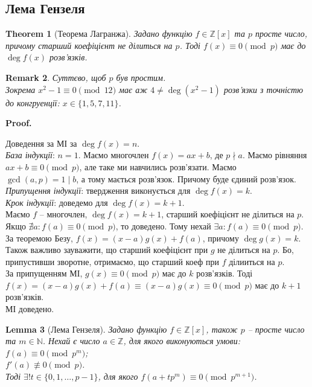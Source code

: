 \documentclass[a4paper, 14pt]{extarticle}
\makeatletter
\theoremstyle{theoremdd}
\newtheorem{theorem}{Theorem}[subsection]
\theoremstyle{theoremdd}
\theoremstyle{theoremdd}
\theoremstyle{theoremdd}
\theoremstyle{theoremdd}
\theoremstyle{theoremdd}
\newtheorem{remark}[theorem]{Remark}
\theoremstyle{theoremdd}
\newtheorem{lemma}[theorem]{Lemma}
\theoremstyle{theoremdd}
\def\qed{$\blacksquare$}
\renewenvironment{proof}[1][Proof.\\]{\par
\pushQED{\hfill \qed}%
\normalfont \topsep6\p@\@plus6\p@\relax
\trivlist
\item\relax
{\bfseries
#1\@addpunct{.}}\hspace\labelsep\ignorespaces
}{%
\popQED\endtrivlist\@endpefalse
}
\makeatother
\begin{document}
\subsection{Лема Гензеля}
\begin{theorem}[Теорема Лагранжа]
Задано функцію $f \in \mathbb{Z}[x]$ та $p$ просте число, причому старший коефіцієнт не ділиться на $p$. Тоді $f(x) \equiv 0 \pmod p$ має до $\deg f(x)$ розв'язків.
\end{theorem}

\begin{remark}
Суттєво, щоб $p$ був простим.\\
Зокрема $x^2 -1 \equiv 0 \pmod {12}$ має аж $4 \neq \deg (x^2-1)$ розв'язки з точністю до конгруенції: $x \in \{1,5,7,11\}$.
\end{remark}

\begin{proof}
Доведення за МІ за $\deg f(x) = n$.\\
\textit{База індукції}: $n = 1$. Маємо многочлен $f(x) = ax+b$, де $p \nmid a$. Маємо рівняння $ax+b \equiv 0 \pmod p$, але таке ми навчились розв'язати. Маємо $\gcd(a,p) = 1 \mid b$, а тому мається розв'язок. Причому буде єдиний розв'язок.\\
\textit{Припущення індукції}: твердження виконується для $\deg f(x) = k$.\\ \textit{Крок індукції}: доведемо для $\deg f(x) = k+1$.\\
Маємо $f$ -- многочлен, $\deg f(x) = k+1$, старший коефіцієнт не ділиться на $p$. Якщо $\nexists a: f(a) \equiv 0 \pmod p$, то доведено. Тому нехай $\exists a: f(a) \equiv 0 \pmod p$. За теоремою Безу, $f(x) = (x-a)g(x) + f(a)$, причому $\deg g(x) = k$. Також важливо зауважити, що старший коефіцієнт при $g$ не ділиться на $p$. Бо, припустивши зворотне, отримаємо, що старший коеф при $f$ ділииться на $p$.\\
За припущенням МІ, $g(x) \equiv 0 \pmod p$ має до $k$ розв'язків. Тоді $f(x) = (x-a)g(x) + f(a) \equiv (x-a)g(x) \equiv 0 \pmod p$ має до $k+1$ розв'язків.\\
МІ доведено.
\end{proof}

\begin{lemma}[Лема Гензеля]
Задано функцію $f \in \mathbb{Z}[x]$, також $p$ -- просте число та $m \in \mathbb{N}$. Нехай є число $a \in \mathbb{Z}$, для якого виконуються умови:\\
$f(a) \equiv 0 \pmod {p^m}$;\\
$f'(a) \not\equiv 0 \pmod p$.\\
Тоді $\exists !t \in \{0,1,\dots,p-1\}$, для якого $f(a+tp^m) \equiv 0 \pmod{p^{m+1}}$.
\end{lemma}
\end{document}

